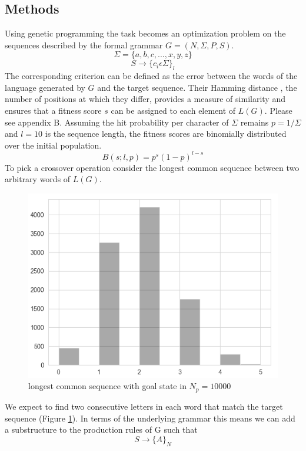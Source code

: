 \documentclass{article}
\begin{document}
\begin{multicols}{2}
		\section{Methods}
		Using genetic programming the task becomes an optimization problem on the sequences described by the formal grammar
		\(G=(N,\Sigma,P,S)\).
		\[\Sigma=\{a,b,c,...,x,y,z\}\]
		\[S\rightarrow\{c_i \epsilon \Sigma\}_{l}\]
		The corresponding criterion can be defined as the error between the words of the language generated by \(G\) and the target sequence. Their Hamming distance \cite[p.~8f.]{hammingdistance}, the number of positions at which they differ, provides a measure of similarity and ensures that a fitness score \(s\) can be assigned to each element of \(L(G)\). Please see appendix B.
		Assuming the hit probability per character of \(\Sigma\) remains \(p=1/\Sigma\) and \(l=10\) is the sequence length, 
		the fitness scores are binomially distributed over the initial population.
		\[ B(s;l,p)=p^s (1-p)^{l-s} \]
		To pick a crossover operation \cite{naturalcomputation} consider the longest common sequence \cite{longestcommonseq} between two arbitrary words of \(L(G)\).
		\begin{figure}[H]
			\center
			\includegraphics[width=\linewidth]{data/lcs_Np_10k.png}
			\caption{longest common sequence with goal state in \(N_p = 10000\)}
	  		\label{fig:lcs}
  		\end{figure}
  		We expect to find two consecutive letters in each word that match the target sequence (Figure \ref{fig:lcs}). In terms of the underlying grammar this means we can add a substructure to the production rules of G such that 
  		\[S\rightarrow\{A\}_{N}\]

\end{multicols}
\end{document}
